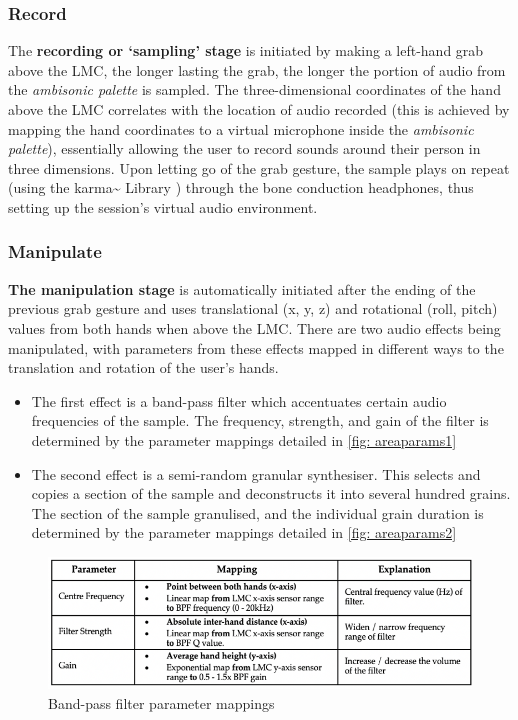 \subsubsection{Record}                          \label{sec: area-system-software-record}
The \textbf{recording or ‘sampling’ stage} is initiated by making a left-hand grab above the LMC, the longer lasting the grab, the longer the portion of audio from the \textit{ambisonic palette} is sampled. The three-dimensional coordinates of the hand above the LMC correlates with the location of audio recorded (this is achieved by mapping the hand coordinates to a virtual microphone inside the \textit{ambisonic palette}), essentially allowing the user to record sounds around their person in three dimensions. Upon letting go of the grab gesture, the sample plays on repeat (using the karma\textasciitilde{} Library \citep{constanzo2015}) through the bone conduction headphones, thus setting up the session’s virtual audio environment.

\subsubsection{Manipulate}                      \label{sec: area-system-software-manip}
\textbf{The manipulation stage} is automatically initiated after the ending of the previous grab gesture and uses translational (x, y, z) and rotational (roll, pitch) values from both hands when above the LMC. There are two audio effects being manipulated, with parameters from these effects mapped in different ways to the translation and rotation of the user’s hands.
\begin{itemize}
    \item The first effect is a band-pass filter which accentuates certain audio frequencies of the sample. The frequency, strength, and gain of the filter is determined by the parameter mappings detailed in \autoref{fig: areaparams1}
    \item The second effect is a semi-random granular synthesiser. This selects and copies a section of the sample and deconstructs it into several hundred grains. The section of the sample granulised, and the individual grain duration is determined by the parameter mappings detailed in \autoref{fig: areaparams2} 
\end{itemize}
\begin{figure}
    \centering
    \includegraphics[width=0.8\linewidth]{figures/05-area/areatechnical_param1.png}
    \caption{Band-pass filter parameter mappings}
    \label{fig: areaparams1}
\end{figure}

